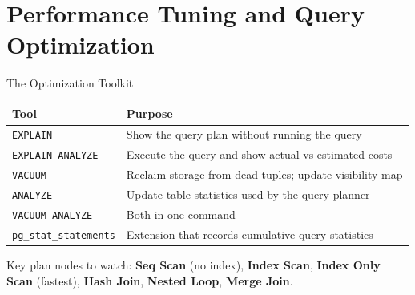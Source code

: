 \documentclass[11pt,a4paper]{article}
\begin{document}

\section{Performance Tuning and Query Optimization}

\begin{conceptbox}{The Optimization Toolkit}
\begin{center}
\begin{tabular}{@{}lp{10cm}@{}}
\toprule
\textbf{Tool} & \textbf{Purpose} \\
\midrule
\texttt{EXPLAIN}         & Show the query plan without running the query \\
\texttt{EXPLAIN ANALYZE} & Execute the query and show actual vs estimated costs \\
\texttt{VACUUM}          & Reclaim storage from dead tuples; update visibility map \\
\texttt{ANALYZE}         & Update table statistics used by the query planner \\
\texttt{VACUUM ANALYZE}  & Both in one command \\
\texttt{pg\_stat\_statements} & Extension that records cumulative query statistics \\
\bottomrule
\end{tabular}
\end{center}
Key plan nodes to watch: \textbf{Seq Scan} (no index), \textbf{Index Scan}, \textbf{Index Only Scan} (fastest), \textbf{Hash Join}, \textbf{Nested Loop}, \textbf{Merge Join}.
\end{conceptbox}
\end{document}
